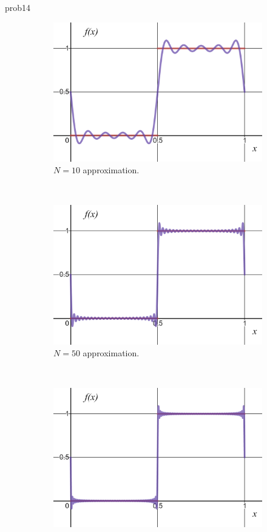 \documentclass{article}
\begin{document}
\begin{solution}{}{prob14}
\begin{figure}[H]
	\begin{subfigure}[h]{0.3\textwidth}
		\includegraphics[width=\textwidth]{N=10.png}
		\caption{$N=10$ approximation.}
	\end{subfigure}
	~ 
	\begin{subfigure}[h]{0.3\textwidth}
		\includegraphics[width=\textwidth]{N=50.png}
		\caption{$N=50$ approximation.}
	\end{subfigure}
	~
	\begin{subfigure}[h]{0.3\textwidth}
		\includegraphics[width=\textwidth]{N=100.png}

\end{subfigure}
\end{figure}
\end{solution}
\end{document}
